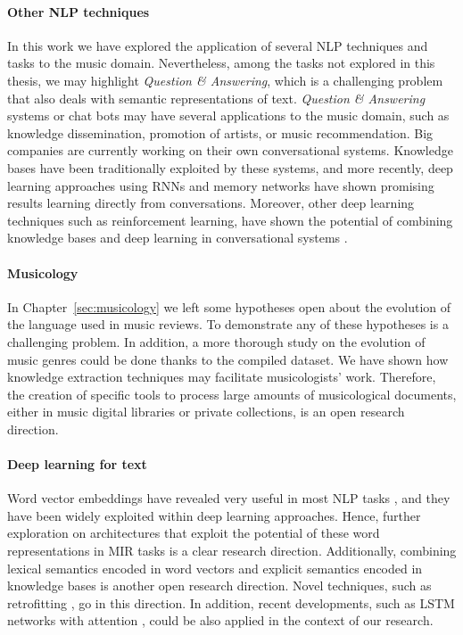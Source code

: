 \paragraph{Other NLP techniques} In this work we have explored the application of several NLP techniques and tasks to the music domain. Nevertheless, among the tasks not explored in this thesis, we may highlight \textit{Question \& Answering}, which is a challenging problem that also deals with semantic representations of text. \textit{Question \& Answering} systems or chat bots may have several applications to the music domain, such as knowledge dissemination, promotion of artists, or music recommendation. Big companies are currently working on their own conversational systems. Knowledge bases have been traditionally exploited by these systems, and more recently, deep learning approaches using RNNs and memory networks have shown promising results learning directly from conversations. Moreover, other deep learning techniques such as reinforcement learning, have shown the potential of combining knowledge bases and deep learning in conversational systems \citep{andreas2016learning}.

\paragraph{Musicology}
In Chapter~\ref{sec:musicology} we left some hypotheses open about the evolution of the language used in music reviews. To demonstrate any of these hypotheses is a challenging problem. In addition, a more thorough study on the evolution of music genres could be done thanks to the compiled dataset. We have shown how knowledge extraction techniques may facilitate musicologists' work. Therefore, the creation of specific tools to process large amounts of musicological documents, either in music digital libraries or private collections, is an open research direction.

\paragraph{Deep learning for text} Word vector embeddings have revealed very useful in most NLP tasks \citep{Collobert2011}, and they have been widely exploited within deep learning approaches. Hence, further exploration on architectures that exploit the potential of these word representations in MIR tasks is a clear research direction. Additionally, combining lexical semantics encoded in word vectors and explicit semantics encoded in knowledge bases is another open research direction. Novel techniques, such as retrofitting \citep{faruqui2014retrofitting}, go in this direction. In addition, recent developments, such as LSTM networks with attention \citep{lin2017structured}, could be also applied in the context of our research.

